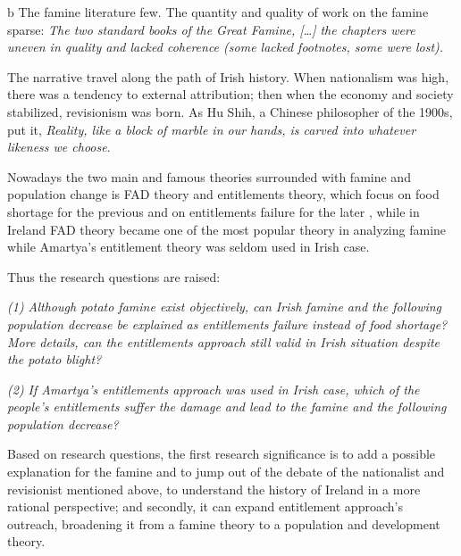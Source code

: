 \begin{table}[h]
\begin{threeparttable}
\begin{tablenotes}
			\vspace{7pt}

			\item[b] The famine literature few. The quantity and quality of work on the famine sparse: \textit{The two standard books of the Great Famine, [\ldots] the chapters were uneven in quality and lacked coherence (some lacked footnotes, some were lost).} \citep{kinealy2017great}

		\end{tablenotes}
	\end{threeparttable}
\end{table}

\vspace{-5pt}

The narrative travel along the path of Irish history. When nationalism was high, there was a tendency to external attribution; then when the economy and society stabilized, revisionism was born. As Hu Shih, a Chinese philosopher of the 1900s, put it, \textit{Reality, like a block of marble in our hands, is carved into whatever likeness we choose}.

Nowadays the two main and famous theories surrounded with famine and population change is FAD theory and entitlements theory, which focus on food shortage for the previous and on entitlements failure for the later \citep{nayak2000understanding}, while in Ireland FAD theory became one of the most popular theory in analyzing famine while Amartya's entitlement theory was seldom used in Irish case. 

Thus the research questions are raised: 

\textit{(1) Although potato famine exist objectively, can Irish famine and the following population decrease be explained as entitlements failure instead of food shortage? More details, can the entitlements approach still valid in Irish situation despite the potato blight?} 

\textit{(2) If Amartya's entitlements approach was used in Irish case, which of the people's entitlements suffer the damage and lead to the famine and the following population decrease?} 

Based on research questions, the first research significance is to add a possible explanation for the famine and to jump out of the debate of the nationalist and revisionist mentioned above, to understand the history of Ireland in a more rational perspective; and secondly, it can expand entitlement approach's outreach, broadening it from a famine theory to a population and development theory. 
